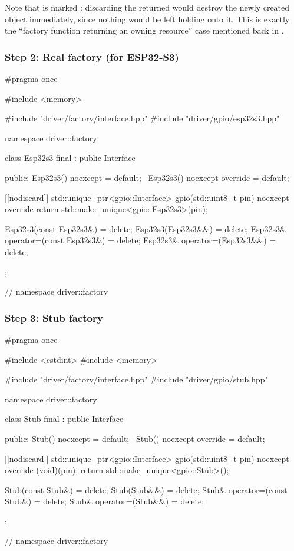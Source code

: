 Note that  is marked \code{[[nodiscard]]}: discarding the returned
 would destroy the newly created object immediately, since nothing would be
left holding onto it. This is exactly the ``factory function returning an owning resource'' case
mentioned back in .

\subsubsection{Step 2: Real factory (for ESP32-S3)}

\begin{cppcode}
#pragma once

#include <memory>

#include "driver/factory/interface.hpp"
#include "driver/gpio/esp32s3.hpp"

namespace driver::factory
{
class Esp32s3 final : public Interface
{
public:
    Esp32s3() noexcept = default;
    ~Esp32s3() noexcept override = default;

    [[nodiscard]] std::unique_ptr<gpio::Interface> gpio(std::uint8_t pin) noexcept override
    {
        return std::make_unique<gpio::Esp32s3>(pin);
    }

    Esp32s3(const Esp32s3&)            = delete;
    Esp32s3(Esp32s3&&)                 = delete;
    Esp32s3& operator=(const Esp32s3&) = delete;
    Esp32s3& operator=(Esp32s3&&)      = delete;
};
} // namespace driver::factory
\end{cppcode}

\subsubsection{Step 3: Stub factory}

\begin{cppcode}
#pragma once

#include <cstdint>
#include <memory>

#include "driver/factory/interface.hpp"
#include "driver/gpio/stub.hpp"

namespace driver::factory
{
class Stub final : public Interface
{
public:
    Stub() noexcept = default;
    ~Stub() noexcept override = default;

    [[nodiscard]] std::unique_ptr<gpio::Interface> gpio(std::uint8_t pin) noexcept override
    {
        (void)(pin);
        return std::make_unique<gpio::Stub>();
    }

    Stub(const Stub&)            = delete;
    Stub(Stub&&)                 = delete;
    Stub& operator=(const Stub&) = delete;
    Stub& operator=(Stub&&)      = delete;
};
} // namespace driver::factory
\end{cppcode}

